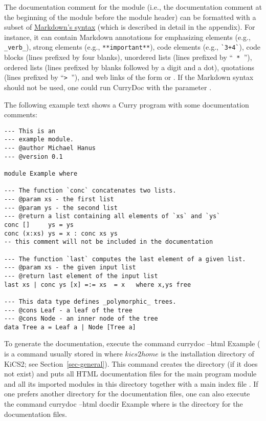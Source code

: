 The documentation comment for the module (i.e., the documentation
comment at the beginning of the module before the module header)
can be formatted with a subset of
\href{http://en.wikipedia.org/wiki/Markdown}{Markdown's syntax}
(which is described in detail in the appendix).
For instance, it can contain Markdown annotations for
emphasizing elements (e.g., \verb!_verb_!),
strong elements (e.g., \verb!**important**!),
code elements (e.g., \verb!`3+4`!), code blocks (lines prefixed by four blanks),
unordered lists (lines prefixed by  ``\verb! * !''),
ordered lists (lines prefixed by blanks followed by a digit and a dot),
quotations (lines prefixed by ``\verb!> !''),
and web links of the form 
or .
If the Markdown syntax should not be used, one could run CurryDoc
with the parameter .

The following example text shows a Curry program with some
documentation comments:
{\renewcommand{\baselinestretch}{1.0}
\begin{verbatim}
--- This is an
--- example module.
--- @author Michael Hanus
--- @version 0.1

module Example where

--- The function `conc` concatenates two lists.
--- @param xs - the first list
--- @param ys - the second list
--- @return a list containing all elements of `xs` and `ys`
conc []     ys = ys
conc (x:xs) ys = x : conc xs ys
-- this comment will not be included in the documentation

--- The function `last` computes the last element of a given list.
--- @param xs - the given input list
--- @return last element of the input list
last xs | conc ys [x] =:= xs  = x   where x,ys free

--- This data type defines _polymorphic_ trees.
--- @cons Leaf - a leaf of the tree
--- @cons Node - an inner node of the tree
data Tree a = Leaf a | Node [Tree a]
\end{verbatim}
}
\noindent
To generate the documentation, execute the command
\startprog
currydoc --html Example
\stopprog
( is a command usually stored in 
where $kics2home$ is the installation directory of KiCS2;
see Section~\ref{sec-general}).
This command creates the directory  (if it does not exist)
and puts all HTML documentation files for the main program module
and all its imported modules in this directory together with
a main index file .
If one prefers another directory for the documentation files,
one can also execute the command
\startprog
currydoc --html docdir Example
\stopprog
where  is the directory for the documentation files.

